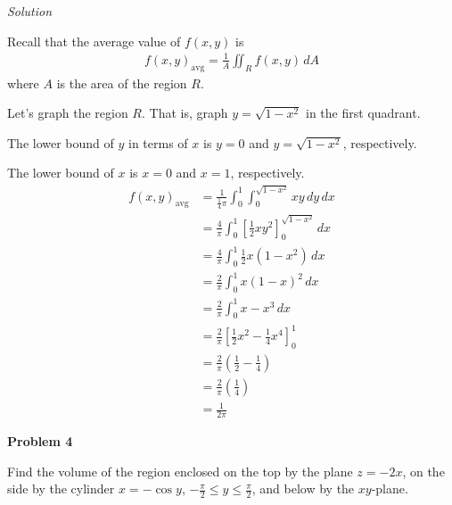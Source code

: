 \documentclass{article}
\newcommand{\lrp}[1]{\left( #1 \right)}
\newcommand{\lrb}[1]{\left[ #1 \right]}
\newcommand{\Solution}{\textit{Solution}}
\begin{document}
\Solution

Recall that the average value of $f(x,y)$ is
\begin{align*}
    f(x,y)_{\text{avg}}=\frac{1}{A}\iint_R f(x,y)\,dA
\end{align*}
where $A$ is the area of the region $R$.

Let's graph the region $R$. That is, graph $y=\sqrt{1-x^2}$ in the first quadrant.
\begin{center}
\end{center}

The lower bound of $y$ in terms of $x$ is $y=0$ and $y=\sqrt{1-x^2}$, respectively.

The lower bound of $x$ is $x=0$ and $x=1$, respectively.
\begin{align*}
    f(x,y)_{\text{avg}}&=\frac{1}{\frac{1}{4}\pi}\int_0^1\int_{0}^{\sqrt{1-x^2}}xy\,dy\,dx\\
    &=\frac{4}{\pi}\int_0^1\lrb{\frac{1}{2}xy^2}_0^{\sqrt{1-x^2}}\,dx\\
    &=\frac{4}{\pi}\int_0^1 \frac{1}{2}x(1-x^2)\,dx\\
    &=\frac{2}{\pi}\int_0^1 x(1-x)^2\,dx\\
    &=\frac{2}{\pi}\int_0^1 x-x^3\,dx\\
    &=\frac{2}{\pi}\lrb{\frac{1}{2}x^2-\frac{1}{4}x^4}_0^1\\
    &=\frac{2}{\pi}\lrp{\frac{1}{2}-\frac{1}{4}}\\
    &=\frac{2}{\pi}\lrp{\frac{1}{4}}\\
    &=\boxed{\frac{1}{2\pi}}
\end{align*}
{}\textbf{Problem 4}

Find the volume of the region enclosed on the top by the plane $z = -2x$, on the side by the cylinder $x = -\cos y$, $\displaystyle -\frac{\pi}{2}\leq y\leq \frac{\pi}{2}$, and below by the $xy$-plane.
\end{document}
